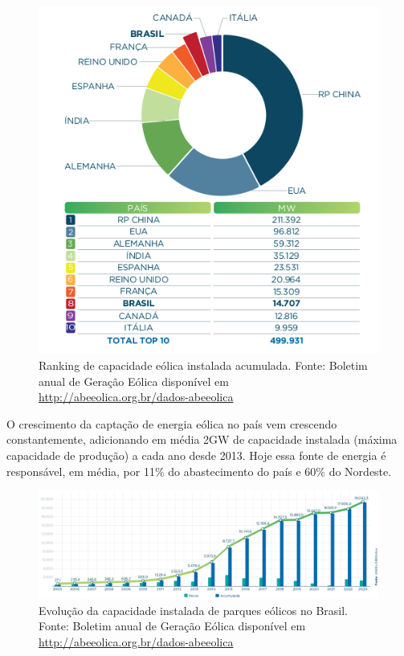 \documentclass[
	12pt,				%
	openright,			%
	oneside,			%
	a4paper,			%
	english,			%
	french,				%
	spanish,			%
	brazil				%
	]{abntex2}
\begin{document}
\begin{figure}[h]
    \centering
	\includegraphics[scale=0.6]{abe_maiores_produtores}
	\caption{Ranking de capacidade eólica instalada acumulada. Fonte: Boletim anual de Geração Eólica disponível em \url{http://abeeolica.org.br/dados-abeeolica}}
\end{figure}
\FloatBarrier

O crescimento da captação de energia eólica no país vem crescendo constantemente, adicionando em média 2GW de capacidade instalada (máxima capacidade de produção) a cada ano desde 2013. Hoje essa fonte de energia é responsável, em média, por 11\% do abastecimento do país e 60\% do Nordeste.

\begin{figure}[h]
    \centering
	\includegraphics[width=\textwidth]{abe_evolucao_capacidade_instalada}
	\caption{Evolução da capacidade instalada de parques eólicos no Brasil. Fonte: Boletim anual de Geração Eólica disponível em \url{http://abeeolica.org.br/dados-abeeolica}} 
\end{figure}
\FloatBarrier
\end{document}
